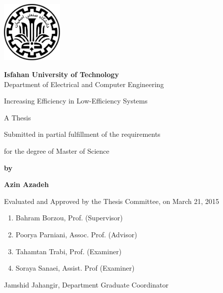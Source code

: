\thispagestyle{empty}
\begin{latin}
\begin{center}
\includegraphics[height=3cm]{iut_logo.png}
\vspace{0.4cm}

{\large\textbf{Isfahan University of Technology}}\\

\vspace{0.4cm}
Department of Electrical and Computer Engineering

\vspace{2.5cm}

{\Huge Increasing Efficiency in Low-Efficiency Systems}

\vspace{1.5cm}

{\large
	A Thesis
	
	\vspace{.3cm}
	
	Submitted in partial fulfillment of the requirements
	
	\vspace{.3cm}
	
	for the degree of Master of Science
}

	\vspace{1.5cm}

{\Large
	\textbf{by}
	
	\vspace{.3cm}
	
	\textbf{Azin Azadeh}
}
\end{center}

\vfill

Evaluated and Approved by the Thesis Committee, on March 21, 2015
\vspace{0.5cm}

\begin{enumerate}
\item Bahram Borzou, Prof. (Supervisor)
\vspace{0.5cm}

\item Poorya Parniani, Assoc. Prof. (Advisor)
\vspace{0.5cm}

\item Tahamtan Trabi, Prof. (Examiner)
\vspace{0.5cm}

\item Soraya Sanaei, Assist. Prof (Examiner)
\vspace{0.5cm}

\end{enumerate}

Jamshid Jahangir, Department Graduate Coordinator

\pagebreak
\end{latin}

\thispagestyle{empty}
\mbox{}

